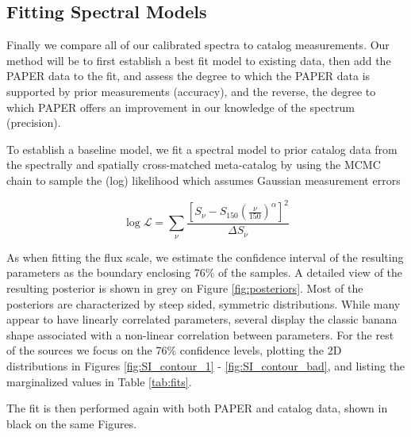 \documentclass[preprint]{aastex}
\newcommand{\logL}{\log\mathcal{L}}
\begin{document}
\subsection{Fitting Spectral Models}
\label{sec:fitting_models}

Finally we compare all of our  calibrated spectra to catalog measurements. Our method
will be to first establish a best fit model to existing data, then add the PAPER data
to the fit, and assess the degree to which the PAPER data is supported by prior measurements (accuracy), and the reverse,
the degree to which PAPER offers an improvement in our knowledge of the spectrum (precision).

 To establish a baseline model, we
fit a spectral model to prior catalog data from the spectrally and spatially
cross-matched meta-catalog by \citet{Vollmer:2010p6422} using the
 MCMC chain to sample the (log) likelihood which assumes Gaussian measurement errors

\begin{equation}
\logL = \sum_\nu{\frac{\left[S_\nu - S_{150}\left(\frac{\nu}{150}\right)^\alpha\right]^2}{\Delta S_\nu} }
\end{equation}

As when fitting the flux scale, 
we estimate the confidence interval of the resulting parameters as the boundary
enclosing 76\% of the samples. A detailed view of the resulting posterior is shown in grey on Figure 
\ref{fig:posteriors}. Most of the posteriors are characterized by steep sided, symmetric 
distributions. While many appear to have linearly correlated parameters, several display
the classic banana shape associated with a non-linear correlation between parameters.
For the rest of the sources we focus on the 76\% confidence levels, plotting the 2D distributions
in Figures \ref{fig:SI_contour_1} - \ref{fig:SI_contour_bad}, and listing the marginalized 
values in Table \ref{tab:fits}.


The fit is then performed again with
both PAPER and catalog data, shown in black on the same Figures. 
\end{document}
